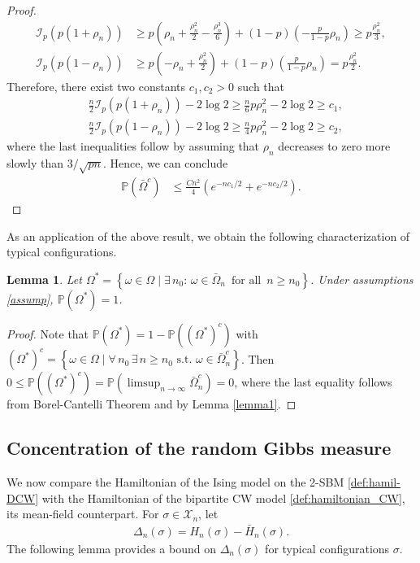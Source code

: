 \documentclass[11pt,oneside]{amsart}
\numberwithin{equation}{section}  %
\theoremstyle{plain}
\newtheorem{lemma}[theorem]{Lemma}
\theoremstyle{remark}
\def \s {{\sigma}}
\begin{document}
\begin{proof}
\begin{equation*}
\begin{split}
\mathscr{I}_{p}(p(1+\rho_n)) 
&\geq  p\left(\rho_n+\frac{\rho_n^{2}}{2}-\frac{\rho_n^{3}}{6}\right)+(1-p)\left(-\frac{p}{1-p} \rho_n\right) \geq p \frac{\rho_n^2}{3},
\\
\mathscr{I}_{p}(p(1-\rho_n)) 
&\geq p\left(-\rho_n+\frac{\rho_n^{2}}{2}\right)+(1-p)\left(\frac{p}{1-p} \rho_n\right) =p \frac{\rho_n^2}{2}.
\end{split}
\end{equation*}
Therefore, there exist two constants $c_1,c_2>0$ such that
\begin{align*}
   &\frac{n}{2} \mathscr{I}_{p}(p(1+\rho_n))- 2\log 2 \geq \frac{n}{6} p \rho_n^2- 2\log 2\geq c_1, \\
   &\frac{n}{2} \mathscr{I}_{p}(p(1-\rho_n))- 2\log 2 \geq \frac{n}{4} p \rho_n^2- 2\log 2 \geq c_2,
\end{align*}
where the last inequalities follow by assuming that $\rho_n$ decreases to zero more slowly than $3/\sqrt{pn}$. Hence, we can conclude
\begin{align*}
   \mathbb{P}\left(\bar{\Omega}^{c}\right) 
&\leq \frac{Cn^2}{4}  \left ( e^{-nc_1/2} + e^{-n c_2/2} \right ).
\end{align*}
\end{proof}

As an application of the above result, we obtain the following characterization of typical configurations.
\begin{lemma}\label{lem:omega*}
Let $\Omega^{*}=\left\{\omega \in \Omega \mid \exists\, n_{0}:\, \omega \in \bar{\Omega}_n \,\text{ for all } \, n \geq n_{0}\right\}$.
Under assumptions \eqref{assump}, $\mathbb{P}(\Omega^{*})=1$.
\end{lemma}

\begin{proof}
Note that $\mathbb{P}\left(\Omega^{*}\right)=1-\mathbb{P}\left(\left(\Omega^{*}\right)^{c}\right)$ with 
$\left(\Omega^{*}\right)^{c}=\left\{\omega \in \Omega \mid \forall\, n_{0} \, \exists\, n \geq n_{0} \text{ s.t. } \omega \in \bar{\Omega}^{c}_n\right\}$.
Then
$0 \leq \mathbb{P}\left(\left(\Omega^{*}\right)^{c}\right)
=\mathbb{P} \left( \limsup_{n\to \infty} \bar{\Omega}^{c}_n\right)=0$,
where the last equality follows from Borel-Cantelli Theorem and by Lemma \eqref{lemma1}. 
\end{proof}

\subsection{Concentration of the random Gibbs measure}\label{subsec:concentration}
We now compare the Hamiltonian of the Ising model on the 2-SBM \eqref{def:hamil-DCW} 
with the Hamiltonian of the bipartite CW model \eqref{def:hamiltonian_CW}, its mean-field counterpart. For $\sigma \in \mathcal{X}_n$, let
\begin{align}\label{perturbation_hamiltonian}
    \Delta_n(\sigma)=H_n(\sigma)-\bar{H}_n(\sigma).
\end{align}
The following lemma  provides a bound on $\Delta_n(\sigma)$
for typical configurations $\s$.
\end{document}

